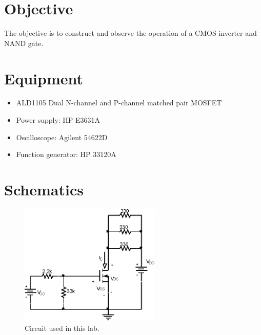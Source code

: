 

\section{Objective}
\label{sec:objective}

The objective is to construct and observe the operation of a CMOS inverter and NAND gate.

\section{Equipment}
\label{sec:equipment}

\begin{itemize}
\item ALD1105 Dual N-channel and P-channel matched pair MOSFET
\item Power supply: HP E3631A
\item Oscilloscope: Agilent 54622D
\item Function generator: HP 33120A
\end{itemize}

 \section{Schematics}
 \label{sec:schematics}

 \begin{figure}[hbtp]
   \centering
   \includegraphics[width=0.6\textwidth]{circuit}
   \caption{\label{fig:circuit} Circuit used in this lab.}
 \end{figure}

